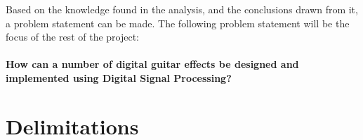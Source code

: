 Based on the knowledge found in the analysis, and the conclusions drawn from it, a problem statement can be made. The following problem statement will be the focus of the rest of the project:
\\
\\
\textbf{How can a number of digital guitar effects be designed and implemented using Digital Signal Processing?}
\section{Delimitations}
